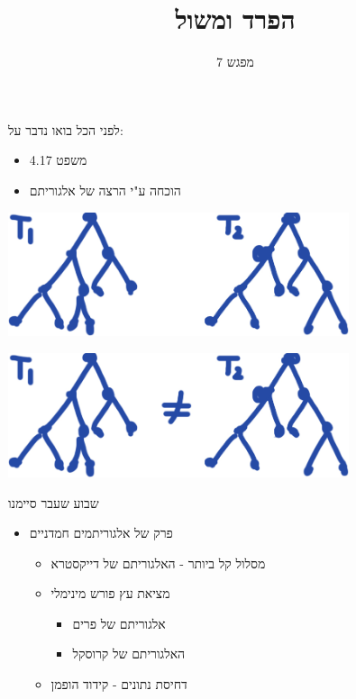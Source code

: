 \documentclass[luatex]{beamer}
\begin{document}
	\title{הפרד ומשול}
	\subtitle{מפגש 7}
	\date{}
	\begin{frame}{לפני הכל בואו נדבר על:}
	\pause
	\begin{itemize}[<+->]
		\item משפט 4.17
		\item הוכחה ע"י הרצה של אלגוריתם
	\end{itemize}
\end{frame}
	\begin{frame}{}
\begin{center}
	\includegraphics[width=10cm]{imgs/trees}
	\end{center}
\end{frame}

\begin{frame}{}
\begin{center}
	\includegraphics[width=10cm]{imgs/trees2}
\end{center}
\end{frame}
	
	\frame{\titlepage}
	\begin{frame}{שבוע שעבר סיימנו}
	\pause
	
	\begin{itemize}[<+->]
		\item פרק של אלגוריתמים חמדניים
		\begin{itemize}[<+->]
\item מסלול קל ביותר - האלגוריתם של דייקסטרא
\item מציאת עץ פורש מינימלי 
\begin{itemize}[<+->]
			\item אלגוריתם של פרים
	\item האלגוריתם של קרוסקל
\end{itemize}
			\item  דחיסת נתונים - קידוד הופמן
		\end{itemize}
	\end{itemize}
\end{frame}
\end{document}
